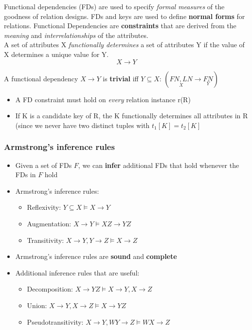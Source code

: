 Functional dependencies (FDs) are used to specify \textit{formal measures} of the goodness of relation designs. FDs and keys are used to define \textbf{normal forms} for relations. Functional Dependencies are \textbf{constraints} that are derived from the \textit{meaning} and \textit{interrelationships} of the attributes.\\

A set of attributes X \textit{functionally determines} a set of attributes Y if the value of X determines a unique value for Y. \[X \rightarrow Y\]

A functional dependency $X\rightarrow Y$ is \textbf{trivial} iff $Y\subseteq X$: \quad $(\underset{X}{FN,LN} \rightarrow \underset{Y}{FN})$ \label{trivial}\\

\begin{itemize}
    \item A FD constraint must hold on \textit{every} relation instance r(R)
    \item If K is a candidate key of R, the K functionally determines all attributes in R (since we never have two distinct tuples with $t_1[K]=t_2[K]$ 
\end{itemize}



\subsubsection{Armstrong's inference rules}
\begin{itemize}
    \item Given a set of FDs $F$, we can \textbf{infer} additional FDs that hold whenever the FDs in $F$ hold
    \item Armstrong's inference rules:
    \begin{itemize}
        \item Reflexivity: $Y\subseteq X \models X\rightarrow Y$
        \item Augmentation: $X \rightarrow Y \models XZ \rightarrow YZ$
        \item Transitivity: $X\rightarrow Y, Y \rightarrow Z \models X \rightarrow Z$
    \end{itemize}
    \item Armstrong's inference rules are \textbf{sound} and \textbf{complete}
    \item Additional inference rules that are useful:
    \begin{itemize}
        \item Decomposition: $X\rightarrow YZ \models X \rightarrow Y, X \rightarrow Z$
        \item Union: $X \rightarrow Y, X \rightarrow Z \models X \rightarrow YZ$
        \item Pseudotransitivity: $X \rightarrow Y, WY \rightarrow Z \models WX \rightarrow Z$
    \end{itemize}
\end{itemize}

